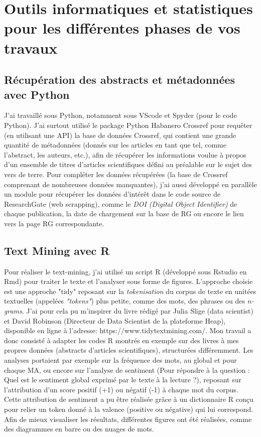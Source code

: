 \documentclass{book}
\begin{document}
\thispagestyle{fancy}

\section[Outils informatiques et statistiques]{Outils informatiques et
  statistiques pour les différentes phases de vos travaux}

\subsection{Récupération des abstracts et métadonnées avec Python}
\noindent
J'ai travaillé sous Python, notamment sous VScode et Spyder (pour le code
Python). J'ai surtout utilisé le package Python Habanero Crossref pour requêter
(en utilisant une API) la base de données Crossref, qui contient une grande
quantité de métadonnées (donnés sur les articles en tant que tel, comme
l'abstract, les auteurs, etc.), afin de récupérer les informations voulue à
propos d'un ensemble de titres d'articles scientifiques défini au préalable sur
le sujet des vers de terre. Pour compléter les données récupérées (la base de
Crossref comprenant de nombreuses données manquantes), j'ai aussi développé en
parallèle un module pour récupérer les données d'intérêt dans le code source de
ResearchGate (web scrapping), comme le \textit{DOI (Digital Object Identifier)}
de chaque publication, la date de chargement sur la base de RG ou encore le
lien vers la page RG correspondante.

\subsection{Text Mining avec R}
\noindent
Pour réaliser le text-mining, j'ai utilisé un script R (développé sous Rstudio
en Rmd) pour traiter le texte et l'analyser sous forme de figures. L'approche
choisie est une approche "tidy" reposant sur la \textit{tokenisation} du corpus
de texte en unitées textuelles (appelées \textit{"tokens"}) plus petite, comme
des mots, des phrases ou des \textit{n-grams}. J'ai pour cela pu m'inspirer du
livre rédigé par Julia Slige (data scientist) et David Robinson (Directeur de
Data Scientist de la plateforme Heap), disponible en ligne à l'adresse:
https://www.tidytextmining.com/. Mon travail a donc consisté à adapter les
codes R montrés en exemple sur des livres à mes propres données (abstracts
d'articles scientifiques), structurées différemment. Les analyses portaient par
exemple sur la fréquence des mots, au global et pour chaque MA, ou encore sur
l'analyse de sentiment (Pour répondre à la question : Quel est le sentiment
global exprimé par le texte à la lecture ?), reposant sur l'attribution d'un
score positif (+1) ou négatif (-1) à chaque mot du corpus. Cette attribution de
sentiment a pu être réalisée grâce à un dictionnaire R conçu pour relier un
token donné à la valence (positive ou négative) qui lui correspond. Afin de
mieux visualiser les résultats, différentes figures ont été réalisées, comme
des diagrammes en barre ou des nuages de mots.
\end{document}
